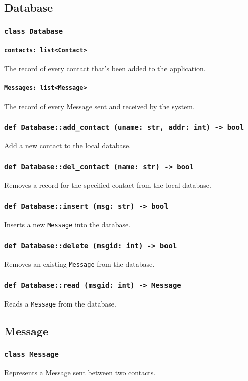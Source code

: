 \documentclass[]{article}
\begin{document}
\subsection{Database}
\subsubsection{\texttt{class Database}}
\paragraph{\texttt{contacts: list<Contact>}} The record of every contact that's been added to the application. 
\paragraph{\texttt{Messages: list<Message>}} The record of every Message sent and received by the system.
\subsubsection{\texttt{def Database::add\_contact (uname: str, addr: int) -> bool}}
Add a new contact to the local database.
\subsubsection{\texttt{def Database::del\_contact (name: str) -> bool}}
Removes a record for the specified contact from the local database.
\subsubsection{\texttt{def Database::insert (msg: str) -> bool}}
Inserts a new \verb!Message! into the database.
\subsubsection{\texttt{def Database::delete (msgid: int) -> bool}}
Removes an existing \verb!Message! from the database.
\subsubsection{\texttt{def Database::read (msgid: int) -> Message}}
Reads a \verb!Message! from the database.

\subsection{Message}
\subsubsection{\texttt{class Message}}
Represents a Message sent between two contacts.
\end{document}
